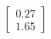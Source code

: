\documentclass[preview]{standalone}
\begin{document}
\begin{align*}
\begin{bmatrix} 0.27 \\ 1.65 \end{bmatrix}
\end{align*}
\end{document}
